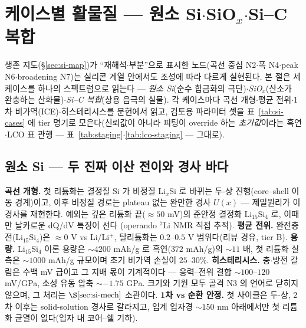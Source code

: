\section{케이스별 활물질 --- 원소 Si$\cdot$SiO$_x$$\cdot$Si--C 복합}\label{sec:si-cases}
생존 지도(\S\ref{sec:si-map})가 ``재해석$\cdot$부분''으로 표시한 노드(곡선 중심 N2$\cdot$폭 N4$\cdot$peak
N6$\cdot$broadening N7)는 실리콘 계열 안에서도 조성에 따라 다르게 실현된다. 본 절은 세 케이스를 하나의
스펙트럼으로 읽는다 --- \emph{원소 Si}(순수 합금화의 극단)$\cdot$\emph{SiO$_x$}(산소가 완충하는
산화물)$\cdot$\emph{Si--C 복합}(상용 음극의 실물). 각 케이스마다 곡선 개형$\cdot$평균 전위$\cdot$1차
비가역(ICE)$\cdot$히스테리시스를 문헌에서 읽고, 검토용 파라미터 셋을 표~\ref{tab:si-cases} 에
tier 명기로 모은다(신뢰값이 아니라 피팅이 override 하는 \emph{초기값}이라는 흑연$\cdot$LCO 표 관행
--- 표~\ref{tab:staging}$\cdot$\ref{tab:lco-staging} --- 그대로).

\subsection{원소 Si --- 두 진짜 이산 전이와 경사 바다}\label{ssec:si-elemental}
\textbf{곡선 개형.} 첫 리튬화는 결정질 Si 가 비정질 Li$_x$Si 로 바뀌는 두-상 진행(core--shell 이동
경계)이고\cite{limthongkul2003,li_dahn2007}, 이후 비정질 경로는 plateau 없는 완만한 경사 $U(x)$
--- 제일원리가 이 경사를 재현한다\cite{chevrier_dahn2009}. 예외는 깊은 리튬화 끝($\approx50$ mV)의
준안정 결정화 Li$_{15}$Si$_4$ 로, 이때만 날카로운 dQ/dV 특징이 선다\cite{obrovac_christensen2004}
(operando $^7$Li NMR 직접 추적\cite{ogata_nmr2014}). \textbf{평균 전위.} 완전충전(Li$_{15}$Si$_4$)은
$\approx0$ V vs Li/Li$^+$, 탈리튬화는 $0.2$--$0.5$ V 범위다\cite{obrovac_chevrier2014}(리뷰 경유, tier B).
\textbf{용량.} Li$_{15}$Si$_4$ 이론 용량은 $\sim4200$ mAh/g 로 흑연($372$ mAh/g)의 $\sim11$
배\cite{wen_huggins1981}, 첫 리튬화 실측은 $\sim1000$ mAh/g 규모이며 초기 비가역 손실이
$25$--$30\%$\cite{limthongkul2003}. \textbf{히스테리시스.} 충$\cdot$방전 갈림은 수백 mV 급이고 그
지배 몫이 기계적이다 --- 응력--전위 결합 $\sim100$--$120$ mV/GPa\cite{sethuraman_stresspot2010},
소성 유동 압축 $\sim-1.75$ GPa\cite{sethuraman_stressevo2010}. 크기와 기원 모두 골격 N3 의 언어로
닫히지 않으며, 그 처리는 $\S\ref{sec:si-mech}$ 소관이다. \textbf{1차 vs 순환 안정.} 첫 사이클은 두-상,
2차 이후는 solid-solution 경사로 갈라지고\cite{wang_asi2013}, 임계 입자경 $\sim150$ nm 아래에서만 첫
리튬화 균열이 없다\cite{liu_sizefracture2012}(입자 내 코어--쉘 기하\cite{mcdowell_coreshell2013}).

